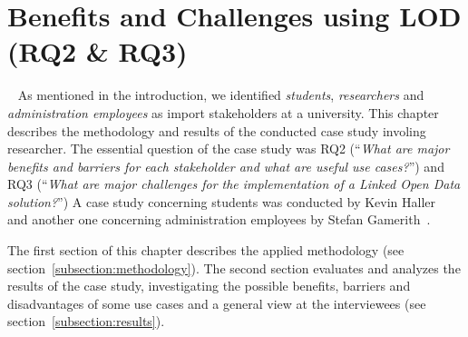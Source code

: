 \section{Benefits and Challenges using LOD (RQ2 \& RQ3)}~\label{section:benefits}
As mentioned in the introduction, we identified \textit{students}, \textit{researchers} and \textit{administration employees} as import stakeholders at a university. This chapter describes the methodology and results of the conducted case study involing researcher. The essential question of the case study was RQ2 (``\textit{What are major benefits and barriers for each stakeholder and what are useful use cases?}'') and RQ3 (``\textit{What are major challenges for the implementation of a Linked Open Data solution?}'') 
A case study concerning students was conducted by Kevin Haller~\cite{article:haller_publishing_2016} and another one concerning administration employees by Stefan Gamerith~\cite{article:gamerith_publishing_2016}.

The first section of this chapter describes the applied methodology (see section~\ref{subsection:methodology}). The second section evaluates and analyzes the results of the case study, investigating the possible benefits, barriers and disadvantages of some use cases and a general view at the interviewees (see section~\ref{subsection:results}).


\newpage


